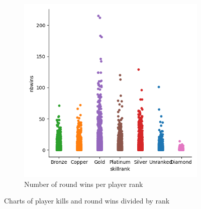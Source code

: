 \documentclass[12pt]{article}
\begin{document}
\begin{figure}[H]
\begin{subfigure}[h]{0.49\linewidth}
		\includegraphics[width=\textwidth]{wins-rank}
		\caption{Number of round wins per player rank}
	\end{subfigure}
	\caption{Charts of player kills and round wins divided by rank}
	\label{fig:wins-kills-rank}
\end{figure}
\end{document}

